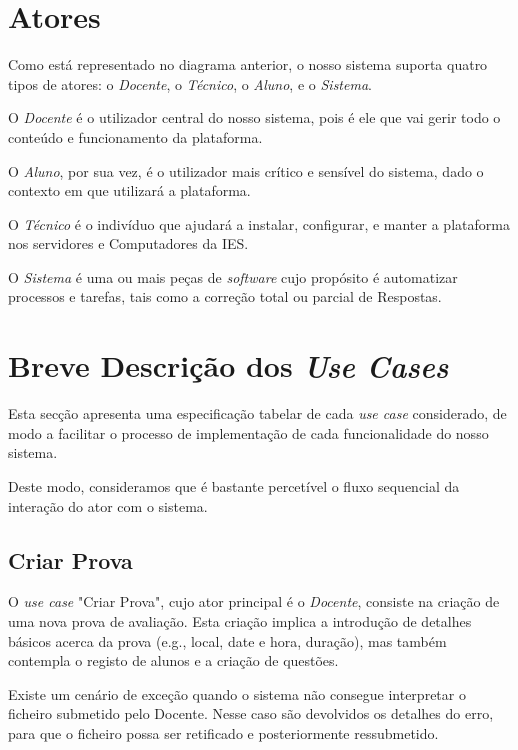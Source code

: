 
\newpage


\section*{Atores}
{\TextoCor
Como está representado no diagrama anterior, o nosso sistema suporta quatro tipos de atores: o \textit{Docente}, o \textit{Técnico}, o \textit{Aluno}, e o \textit{Sistema}. 

O \textit{Docente} é o utilizador central do nosso sistema, pois é ele que vai gerir todo o conteúdo e funcionamento da plataforma.

O \textit{Aluno}, por sua vez, é o utilizador mais crítico e sensível do sistema, dado o contexto em que utilizará a plataforma.

O \textit{Técnico} é o indivíduo que ajudará a instalar, configurar, e manter a plataforma nos servidores e Computadores da IES.

O \textit{Sistema} é uma ou mais peças de \textit{software} cujo propósito é automatizar processos e tarefas, tais como a correção total ou parcial de Respostas.
}



\section*{Breve Descrição dos \textit{Use Cases}}
{\TextoCor
Esta secção apresenta uma especificação tabelar de cada \textit{use case} considerado, de modo a facilitar o processo de implementação de cada funcionalidade do nosso sistema.

Deste modo, consideramos que é bastante percetível o fluxo sequencial da interação do ator com o sistema.

\setcounter{useCases}{0}

\newcommand{\descCenario}[3]{
    \begin{tabular}[c]{@{}l@{}}\textbf{#1}\\ {[}#2]\\ (#3){]}\end{tabular}
}
}

\subsection*{Criar Prova}

{\TextoCor
O \textit{use case} "Criar Prova", cujo ator principal é o \textit{Docente}, consiste na criação de uma nova prova de avaliação.
Esta criação implica a introdução de detalhes básicos acerca da prova (e.g., local, date e hora, duração), mas também contempla o registo de alunos e a criação de questões.

Existe um cenário de exceção quando o sistema não consegue interpretar o ficheiro submetido pelo Docente. Nesse caso são devolvidos os detalhes do erro, para que o ficheiro possa ser retificado e posteriormente ressubmetido.
}


